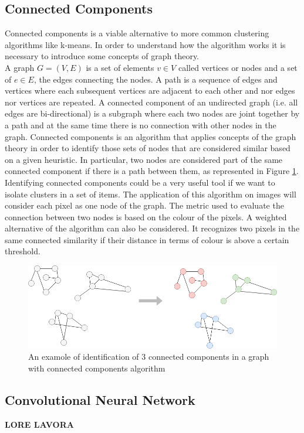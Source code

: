 \documentclass{usiinftr}
\begin{document}
\subsection{Connected Components}
Connected components is a viable alternative to more common clustering algorithms like k-means. In order to understand how the algorithm works it is necessary to introduce some concepts of graph theory. \\
A graph $G=(V,E)$ is a set of elements $v \in V$ called vertices or nodes and a set of $e \in E$, the edges connecting the nodes. A path is a sequence of edges and vertices where each subsequent vertices are adjacent to each other and nor edges nor vertices are repeated\cite{12}. 
A connected component of an undirected graph (i.e. all edges are bi-directional)  is a subgraph where each two nodes are joint together by a path and at the same time  there is no connection with other nodes in the graph. 
Connected components is an algorithm that applies concepts of the graph theory in order to identify those sets of nodes that are considered similar based on a given heuristic. In particular, two nodes are considered part of the same connected component if there is a path between them, as represented in Figure \ref{fig:2}. \\
Identifying connected components could be a very useful tool if we want to isolate clusters in a set of items. 
The application of this algorithm on images will consider each pixel as one node of the graph. The metric used to evaluate the connection between two nodes is based on the colour of the pixels. A weighted alternative of the algorithm can also be considered. It recognizes two pixels in the same connected similarity if their distance in terms of colour is above a certain threshold.\\

\begin{figure}[h]
	\centering
	\includegraphics[width=0.6\linewidth]{img/conn_comp}
	\caption{An examole of identification of 3 connected components in a graph with connected components algorithm}
	\label{fig:2}
\end{figure}


\subsection{Convolutional Neural Network}
\textbf{LORE LAVORA}
\end{document}
